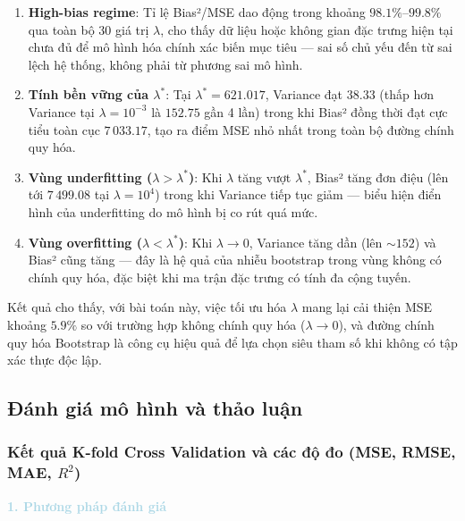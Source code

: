 \begin{enumerate}
    \item \textbf{High-bias regime}: Tỉ lệ Bias²/MSE dao động trong khoảng $98.1\%$--$99.8\%$ qua toàn bộ 30 giá trị $\lambda$, cho thấy dữ liệu hoặc không gian đặc trưng hiện tại chưa đủ để mô hình hóa chính xác biến mục tiêu — sai số chủ yếu đến từ sai lệch hệ thống, không phải từ phương sai mô hình.

    \item \textbf{Tính bền vững của $\lambda^*$}: Tại $\lambda^* = 621.017$, Variance đạt $38.33$ (thấp hơn Variance tại $\lambda = 10^{-3}$ là $152.75$ gần 4 lần) trong khi Bias² đồng thời đạt cực tiểu toàn cục $7\,033.17$, tạo ra điểm MSE nhỏ nhất trong toàn bộ đường chính quy hóa.

    \item \textbf{Vùng underfitting ($\lambda > \lambda^*$)}: Khi $\lambda$ tăng vượt $\lambda^*$, Bias² tăng đơn điệu (lên tới $7\,499.08$ tại $\lambda = 10^4$) trong khi Variance tiếp tục giảm — biểu hiện điển hình của underfitting do mô hình bị co rút quá mức.

    \item \textbf{Vùng overfitting ($\lambda < \lambda^*$)}: Khi $\lambda \to 0$, Variance tăng dần (lên $\sim 152$) và Bias² cũng tăng — đây là hệ quả của nhiễu bootstrap trong vùng không có chính quy hóa, đặc biệt khi ma trận đặc trưng có tính đa cộng tuyến.
\end{enumerate}

\noindent Kết quả cho thấy, với bài toán này, việc tối ưu hóa $\lambda$ mang lại cải thiện MSE khoảng $5.9\%$ so với trường hợp không chính quy hóa ($\lambda \to 0$), và đường chính quy hóa Bootstrap là công cụ hiệu quả để lựa chọn siêu tham số khi không có tập xác thực độc lập.


\subsection{Đánh giá mô hình và thảo luận}

\subsubsection{Kết quả K-fold Cross Validation và các độ đo (MSE, RMSE, MAE, $R^2$)}

\noindent\textcolor{lightblue}{\textbf{1. Phương pháp đánh giá}}

